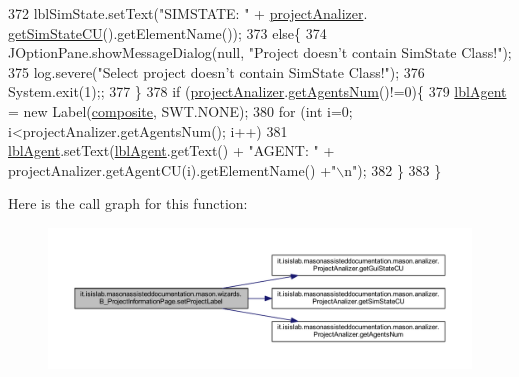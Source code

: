 \begin{DoxyCode}
372             lblSimState.setText(\textcolor{stringliteral}{"SIMSTATE: "} + \hyperlink{classit_1_1isislab_1_1masonassisteddocumentation_1_1mason_1_1wizards_1_1_b___project_information_page_a5129feb0fa34a1d51e44a2fe495ac42c}{projectAnalizer}.
      \hyperlink{classit_1_1isislab_1_1masonassisteddocumentation_1_1mason_1_1analizer_1_1_project_analizer_aab153a7017dc5c1941d353be201491c3}{getSimStateCU}().getElementName());
373         \textcolor{keywordflow}{else}\{
374             JOptionPane.showMessageDialog(null, \textcolor{stringliteral}{"Project doesn't contain SimState Class!"});
375             log.severe(\textcolor{stringliteral}{"Select project doesn't contain SimState Class!"});
376             System.exit(1);;
377         \}           
378         \textcolor{keywordflow}{if} (\hyperlink{classit_1_1isislab_1_1masonassisteddocumentation_1_1mason_1_1wizards_1_1_b___project_information_page_a5129feb0fa34a1d51e44a2fe495ac42c}{projectAnalizer}.\hyperlink{classit_1_1isislab_1_1masonassisteddocumentation_1_1mason_1_1analizer_1_1_project_analizer_aac2a739694623fe15e566ca0330bce3c}{getAgentsNum}()!=0)\{
379             \hyperlink{classit_1_1isislab_1_1masonassisteddocumentation_1_1mason_1_1wizards_1_1_b___project_information_page_af5b4ee969085257cfe8a66867d217b8d}{lblAgent} = \textcolor{keyword}{new} Label(\hyperlink{classit_1_1isislab_1_1masonassisteddocumentation_1_1mason_1_1wizards_1_1_b___project_information_page_abff2b9b46293282381b6cd1b26f83792}{composite}, SWT.NONE);
380             \textcolor{keywordflow}{for} (\textcolor{keywordtype}{int} i=0; i<projectAnalizer.getAgentsNum(); i++)
381                 \hyperlink{classit_1_1isislab_1_1masonassisteddocumentation_1_1mason_1_1wizards_1_1_b___project_information_page_af5b4ee969085257cfe8a66867d217b8d}{lblAgent}.setText(\hyperlink{classit_1_1isislab_1_1masonassisteddocumentation_1_1mason_1_1wizards_1_1_b___project_information_page_af5b4ee969085257cfe8a66867d217b8d}{lblAgent}.getText() + \textcolor{stringliteral}{"AGENT: "} + 
      projectAnalizer.getAgentCU(i).getElementName() +\textcolor{stringliteral}{"\(\backslash\)n"});
382         \}
383     \}
\end{DoxyCode}


Here is the call graph for this function\-:\nopagebreak
\begin{figure}[H]
\begin{center}
\leavevmode
\includegraphics[width=350pt]{classit_1_1isislab_1_1masonassisteddocumentation_1_1mason_1_1wizards_1_1_b___project_information_page_af5afa21c1d0087572ad8b3d0a1a1fe9c_cgraph}
\end{center}
\end{figure}




